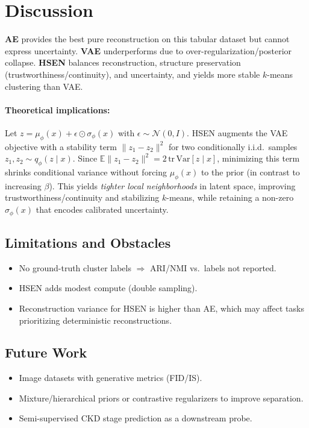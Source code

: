 \documentclass[12pt,a4paper]{article}
\begin{document}
\section{Discussion}
\textbf{AE} provides the best pure reconstruction on this tabular dataset but cannot express uncertainty. \textbf{VAE} underperforms due to over-regularization/posterior collapse. \textbf{HSEN} balances reconstruction, structure preservation (trustworthiness/continuity), and uncertainty, and yields more stable $k$-means clustering than VAE.

\paragraph{Theoretical implications:}
Let $z=\mu_\phi(x)+\epsilon\odot\sigma_\phi(x)$ with $\epsilon\!\sim\!\mathcal{N}(0,I)$. 
HSEN augments the VAE objective with a stability term $\|z_1-z_2\|^2$ for two conditionally i.i.d.\ samples $z_1,z_2\!\sim\!q_\phi(z\mid x)$.
Since $\mathbb{E}\|z_1-z_2\|^2 = 2\,\mathrm{tr}\,\mathrm{Var}[z\mid x]$, minimizing this term shrinks conditional variance without forcing $\mu_\phi(x)$ to the prior (in contrast to increasing $\beta$).
This yields \emph{tighter local neighborhoods} in latent space, improving trustworthiness/continuity and stabilizing $k$-means, while retaining a non-zero $\sigma_\phi(x)$ that encodes calibrated uncertainty.


\subsection{Limitations and Obstacles}
\begin{itemize}
  \item No ground-truth cluster labels $\Rightarrow$ ARI/NMI vs.\ labels not reported.
  \item HSEN adds modest compute (double sampling).
  \item Reconstruction variance for HSEN is higher than AE, which may affect tasks prioritizing deterministic reconstructions.
\end{itemize}

\subsection{Future Work}
\begin{itemize}
  \item Image datasets with generative metrics (FID/IS).
  \item Mixture/hierarchical priors or contrastive regularizers to improve separation.
  \item Semi-supervised CKD stage prediction as a downstream probe.
\end{itemize}
\end{document}

